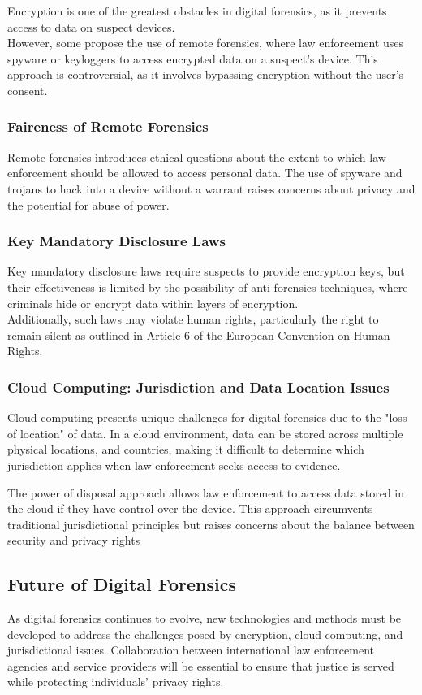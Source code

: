 \noindent
Encryption is one of the greatest obstacles in digital forensics, as it prevents access to data on suspect devices. \\
However, some propose the use of remote forensics, where law enforcement uses spyware or keyloggers to access encrypted data on a suspect's device. This approach is controversial, as it involves bypassing encryption without the user's consent.

\subsubsection*{Faireness of Remote Forensics}
Remote forensics introduces ethical questions about the extent to which law enforcement should be allowed to access personal data. The use of spyware and trojans to hack into a device without a warrant raises concerns about privacy and the potential for abuse of power.

\subsubsection*{Key Mandatory Disclosure Laws}
Key mandatory disclosure laws require suspects to provide encryption keys, but their effectiveness is limited by the possibility of anti-forensics techniques, where criminals hide or encrypt data within layers of encryption.\\ Additionally, such laws may violate human rights, particularly the right to remain silent as outlined in Article 6 of the European Convention on Human Rights.


\subsubsection{Cloud Computing: Jurisdiction and Data Location Issues}
Cloud computing presents unique challenges for digital forensics due to the "loss of location" of data. In a cloud environment, data can be stored across multiple physical locations, and countries, making it difficult to determine which jurisdiction applies when law enforcement seeks access to evidence.
\bigskip

\noindent
The power of disposal approach allows law enforcement to access data stored in the cloud if they have control over the device. This approach circumvents traditional jurisdictional principles but raises concerns about the balance between security and privacy rights

\subsection{Future of Digital Forensics}
As digital forensics continues to evolve, new technologies and methods must be developed to address the challenges posed by encryption, cloud computing, and jurisdictional issues. Collaboration between international law enforcement agencies and service providers will be essential to ensure that justice is served while protecting individuals' privacy rights.

